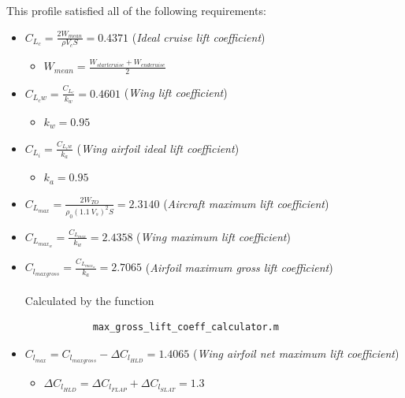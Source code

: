\documentclass{article}
\begin{document}
This profile satisfied all of the following requirements:

\begin{itemize}
    \item $C_{L_c} = \frac{2W_{mean}}{\rho V_c S} = 0.4371$ (\textit{Ideal cruise lift coefficient})
        \begin{itemize}
            \item $W_{mean} = \frac{W_{startcruise}+W_{endcruise}}{2}$
        \end{itemize}
    \item $C_{L_cw} = \frac{C_{L_c}}{k_w} = 0.4601$ (\textit{Wing lift coefficient})
        \begin{itemize}
            \item $k_w = 0.95$
        \end{itemize}
    \item $C_{L_i} = \frac{C_{L_cw}}{k_a}$ (\textit{Wing airfoil ideal lift coefficient})
        \begin{itemize}
            \item $k_a = 0.95$
        \end{itemize}
    \item $C_{L_{max}} = \frac{2W_{TO}}{\rho_0 (1.1 \ V_s)^2S} = 2.3140$ (\textit{Aircraft maximum lift coefficient})
    \item $C_{L_{max_{w}}} = \frac{C_{L_{max}}}{k_w} = 2.4358$ (\textit{Wing maximum lift coefficient})
    \item $C_{l_{maxgross}} = \frac{C_{L_{max_{w}}}}{k_a} = 2.7065$ (\textit{Airfoil maximum gross lift coefficient}) \\ \\ 
        Calculated by the function \autocite{Airbus_replacement_repo} 
        \begin{verbatim}
            max_gross_lift_coeff_calculator.m
        \end{verbatim}

    \item $C_{l_{max}} = C_{l_{maxgross}} - \Delta C_{l_{HLD}} = 1.4065$ (\textit{Wing airfoil net maximum lift coefficient})
        \begin{itemize}
            \item $\Delta C_{l_{HLD}} = \Delta C_{l_{FLAP}} + \Delta C_{l_{SLAT}} = 1.3$
        \end{itemize}
\end{itemize}


\clearpage
\end{document}
